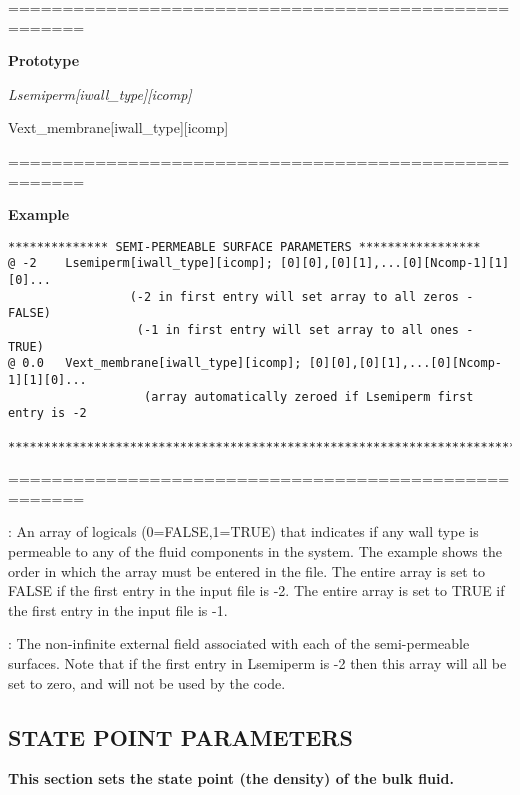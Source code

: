 \documentclass[10pt,onecolumn]{article}
\begin{document}
\vspace{0.1in}
\noindent=====================================================

{\bf Prototype}

{\it Lsemiperm[iwall\_type][icomp]

Vext\_membrane[iwall\_type][icomp]
}

\noindent=====================================================

{\bf Example}

\begin{verbatim}
************** SEMI-PERMEABLE SURFACE PARAMETERS *****************
@ -2    Lsemiperm[iwall_type][icomp]; [0][0],[0][1],...[0][Ncomp-1][1][0]...
                 (-2 in first entry will set array to all zeros - FALSE)
                  (-1 in first entry will set array to all ones -  TRUE)
@ 0.0   Vext_membrane[iwall_type][icomp]; [0][0],[0][1],...[0][Ncomp-1][1][0]...
                   (array automatically zeroed if Lsemiperm first entry is -2

***********************************************************************
\end{verbatim}

\noindent=====================================================
\vspace{0.1in}


\vspace{0.1in}
: An array of logicals (0=FALSE,1=TRUE)
that indicates if any wall type is permeable to any of the fluid
components in the system.  The example shows the order in which
the array must be entered in the file.  The entire array is set to FALSE if the first entry
in the input file is -2.  The entire array is set to TRUE if the first entry in the input file
is -1.

\vspace{0.1in}
:  The non-infinite external field
associated with each of the semi-permeable surfaces.  Note that if the
first entry in Lsemiperm is -2 then this array will all be set to zero, and will
not be used by the code.
\vfill
\break


\vfill
\break

\subsection{STATE POINT PARAMETERS}
{\bf  This section sets the
state point (the density) of the bulk fluid.  }
\end{document}
